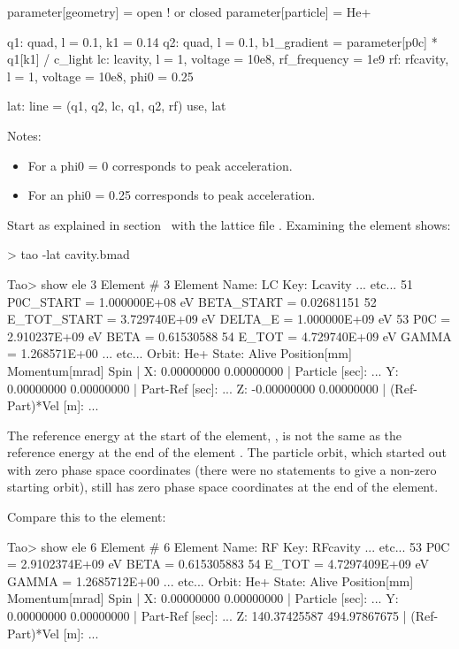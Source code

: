 \documentclass{hitec}     %
\begin{document}
{\begin{code}
parameter[geometry] = open      ! or closed
parameter[particle] = He+ 

q1: quad, l = 0.1, k1 = 0.14
q2: quad, l = 0.1, b1_gradient = parameter[p0c] * q1[k1] / c_light
lc: lcavity, l = 1, voltage = 10e8, rf_frequency = 1e9
rf: rfcavity, l = 1, voltage = 10e8, phi0 = 0.25

lat: line = (q1, q2, lc, q1, q2, rf)
use, lat
\end{code}

Notes:
\vspace{-5 pt}
\begin{itemize}
\item For a  phi0 = 0 corresponds to peak acceleration.
\item For an  phi0 = 0.25 corresponds to peak acceleration.
\end{itemize}

Start \tao as explained in section~ with the lattice file
. Examining the  element shows:
\begin{code}
> tao -lat cavity.bmad

Tao> show ele 3
Element #                3
Element Name: LC
Key: Lcavity
... etc...
   51   P0C_START    =  1.000000E+08 eV        BETA_START   =  0.02681151
   52   E_TOT_START  =  3.729740E+09 eV        DELTA_E      =  1.000000E+09 eV
   53   P0C          =  2.910237E+09 eV        BETA         =  0.61530588
   54   E_TOT        =  4.729740E+09 eV        GAMMA        =  1.268571E+00
... etc...    
Orbit:  He+   State: Alive
         Position[mm] Momentum[mrad]        Spin   |
  X:       0.00000000     0.00000000               | Particle [sec]:     ...
  Y:       0.00000000     0.00000000               | Part-Ref [sec]:     ...
  Z:      -0.00000000     0.00000000               | (Ref-Part)*Vel [m]: ...
\end{code}

The reference energy at the start of the element, , is not the same as the reference
energy at the end of the element . The particle orbit, which started out with zero phase
space coordinates (there were no  statements to give a non-zero starting orbit), still
has zero phase space coordinates at the end of the  element.


Compare this to the  element:
\begin{code}
Tao> show ele 6
Element #                6
Element Name: RF
Key: RFcavity
... etc...
   53   P0C         =  2.9102374E+09 eV         BETA      =  0.615305883
   54   E_TOT       =  4.7297409E+09 eV         GAMMA     =  1.2685712E+00
... etc...
 Orbit:  He+   State: Alive
         Position[mm] Momentum[mrad]        Spin   |
  X:       0.00000000     0.00000000               | Particle [sec]:     ...
  Y:       0.00000000     0.00000000               | Part-Ref [sec]:     ...
  Z:     140.37425587   494.97867675               | (Ref-Part)*Vel [m]: ...
\end{code}

}
\end{document}
